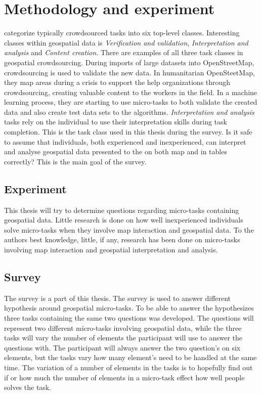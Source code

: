 \chapter{Methodology and experiment}

\cite{Gadiraju2015} categorize typically crowdsourced tasks into six top-level classes. Interesting classes within geospatial data is \textit{Verification and validation}, \textit{Interpretation and analysis} and \textit{Content creation}. There are examples of all three task classes in geospatial crowdsourcing. During imports of large datasets into OpenStreetMap, crowdsourcing is used to validate the new data. In humanitarian OpenSteetMap, they map areas during a crisis to support the help organizations through crowdsourcing, creating valuable content to the workers in the field. In a machine learning process, they are starting to use micro-tasks to both validate the created data and also create test data sets to the algorithms. \textit{Interpretation and analysis} tasks rely on the individual to use their interpretation skills during task completion. This is the task class used in this thesis during the survey. Is it safe to assume that individuals, both experienced and inexperienced, can interpret and analyse geospatial data presented to the on both map and in tables correctly? This is the main goal of the survey. 

\section{Experiment}
This thesis will try to determine questions regarding micro-tasks containing geospatial data. Little research is done on how well inexperienced individuals solve micro-tasks when they involve map interaction and geospatial data. To the authors best knowledge, little, if any, research has been done on micro-tasks involving map interaction and geospatial interpretation and analysis. 

\section{Survey}\label{sec:survey}
The survey is a part of this thesis. The survey is used to answer different hypothesis around geospatial micro-tasks. To be able to answer the hypothesizes three tasks containing the same two questions was developed. The questions will represent two different micro-tasks involving geospatial data, while the three tasks will vary the number of elements the participant will use to answer the questions with. The participant will always answer the two question's on six elements, but the tasks vary how many element's need to be handled at the same time. The variation of a number of elements in the tasks is to hopefully find out if or how much the number of elements in a micro-task effect how well people solves the task. 

